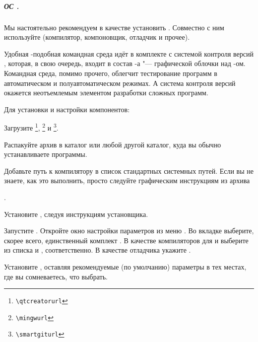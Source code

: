 
\label{subsect:workEnv}

{ %
\newcommand*{\hotkey}[1]{\fbox{\texttt{\small #1}}}
\newcommand*{\hotplus}{{\small\,+\,}}
\newcommand*{\hotkeys}[2]{\hotkey{#1}\hotplus\hotkey{#2}}
\newcommand*{\hotkeyss}[3]{\hotkey{#1}\hotplus\hotkey{#2}\hotplus\hotkey{#3}}



\subparagraph{ОС .}
Мы настоятельно рекомендуем в качестве  установить . Совместно с ним используйте  (компилятор, компоновщик, отладчик и прочее).

Удобная -подобная командная среда  идёт в комплекте с системой контроля версий \href{\giturl}{\git}, которая, в свою очередь, входит в состав -а "--- графической облочки над \git-ом. Командная среда, помимо прочего, облегчит тестирование программ в автоматическом и полуавтоматическом режимах. А система контроля версий окажется неотъемлемым элементом разработки сложных программ.

Для установки и настройки компонентов:
\begin{itemfeature}
\item Загрузите \href{\qtcreatorurl}{}\footnote{\nolinkurl{\qtcreatorurl}}, \href{\mingwurl}{}\footnote{\nolinkurl{\mingwurl}} и \href{\smartgiturl}{}\footnote{\nolinkurl{\smartgiturl}}.
\item Распакуйте архив  в каталог  или любой другой каталог, куда вы обычно устанавливаете программы.
\item Добавьте путь к компилятору в список стандартных системных путей. Если вы не знаете, как это выполнить, просто следуйте графическим инструкциям из архива
\begin{flushleft}
  .
\end{flushleft}
\item Установите , следуя инструкциям установщика.
\item Запустите . Откройте окно настройки параметров из меню  \code{->} . Во вкладке  выберите, скорее всего, единственный комплект . В качестве компиляторов для  и  выберите из списка  \GCC{}  и , соответственно. В качестве отладчика укажите \GDB.
\item Установите , оставляя рекомендуемые (по умолчанию) параметры в тех местах, где вы сомневаетесь, что выбрать.
\end{itemfeature}

}
